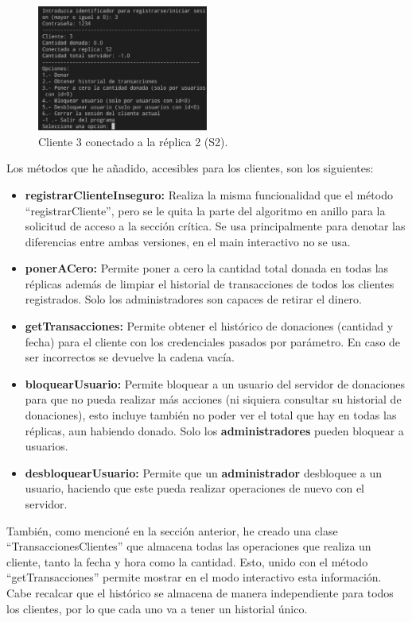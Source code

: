 \documentclass{article}
\begin{document}
\begin{figure}[H]
    \centering
    \includegraphics[width=0.5\textwidth]{imagenes/3replicasS2.png}
    \caption{Cliente 3 conectado a la réplica 2 (S2).}
\end{figure}

\newpage

Los métodos que he añadido, accesibles para los clientes, son los siguientes:

\begin{itemize}
    \item \textbf{registrarClienteInseguro: }Realiza la misma funcionalidad que el método ``registrarCliente'', pero se le quita la parte del algoritmo en anillo para la solicitud de acceso a la sección crítica. Se usa principalmente para denotar las diferencias entre ambas versiones, en el main interactivo no se usa.
    \item \textbf{ponerACero: }Permite poner a cero la cantidad total donada en todas las réplicas además de limpiar el historial de transacciones de todos los clientes registrados. Solo los administradores son capaces de retirar el dinero.
    \item \textbf{getTransacciones: }Permite obtener el histórico de donaciones (cantidad y fecha) para el cliente con los credenciales pasados por parámetro. En caso de ser incorrectos se devuelve la cadena vacía.
    \item \textbf{bloquearUsuario: }Permite bloquear a un usuario del servidor de donaciones para que no pueda realizar más acciones (ni siquiera consultar su historial de donaciones), esto incluye también no poder ver el total que hay en todas las réplicas, aun habiendo donado. Solo los \textbf{administradores} pueden bloquear a usuarios.
    \item \textbf{desbloquearUsuario: }Permite que un \textbf{administrador} desbloquee a un usuario, haciendo que este pueda realizar operaciones de nuevo con el servidor.
\end{itemize}

También, como mencioné en la sección anterior, he creado una clase ``TransaccionesClientes'' que almacena todas las operaciones que realiza un cliente, tanto la fecha y hora como la cantidad. Esto, unido con el método ``getTransacciones'' permite mostrar en el modo interactivo esta información. Cabe recalcar que el histórico se almacena de manera independiente para todos los clientes, por lo que cada uno va a tener un historial único.
\end{document}
